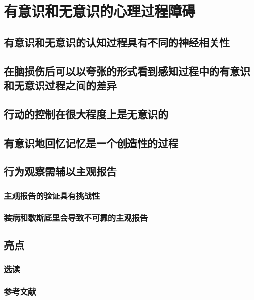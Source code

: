 \chapter{有意识和无意识的心理过程障碍}

\section{有意识和无意识的认知过程具有不同的神经相关性}

\section{在脑损伤后可以以夸张的形式看到感知过程中的有意识和无意识过程之间的差异}

\section{行动的控制在很大程度上是无意识的}

\section{有意识地回忆记忆是一个创造性的过程}

\section{行为观察需辅以主观报告}
\subsection{主观报告的验证具有挑战性}
\subsection{装病和歇斯底里会导致不可靠的主观报告}

\section{亮点}
\subsection{选读}
\subsection{参考文献}